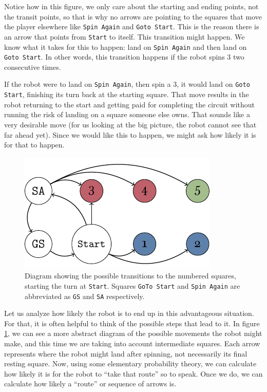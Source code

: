 Notice how in this figure, we only care about the starting and ending points,
not the transit points, so that is why no arrows are pointing to the squares
that move the player elsewhere like \texttt{Spin Again} and \texttt{Goto Start}.
This is the reason there is an arrow that points from \texttt{Start} to itself.
This transition might happen. We know what it takes for this to happen: land on
\texttt{Spin Again} and then land on \texttt{Goto Start}. In other words, this
transition happens if the robot spins 3 two consecutive times.

If the robot were to land on \texttt{Spin Again}, then spin a 3, it would land
on \texttt{Goto Start}, finishing its turn back at the starting square. That
move results in the robot returning to the start and getting paid for completing
the circuit without running the risk of landing on a square someone else owns.
That sounds like a very desirable move (for us looking at the big picture, the
robot cannot see that far ahead yet). Since we would like this to happen, we
might ask how likely it is for that to happen.

\begin{figure}
\centering
\includegraphics[width=\textwidth]{img/transicion.pdf}
\caption{Diagram showing the possible transitions to the 
numbered squares, starting the turn at \texttt{Start}. Squares 
\texttt{GoTo Start} and \texttt{Spin Again} are abbreviated as 
\texttt{GS} and \texttt{SA} respectively.}
\label{fig:markov-start}
\end{figure}

Let us analyze how likely the robot is to end up in this advantageous situation.
For that, it is often helpful to think of the possible steps that lead to it. In
figure \ref{fig:markov-start}, we can see a more abstract diagram of the
possible movements the robot might make, and this time we are taking into
account intermediate squares. Each arrow represents where the robot might land
after spinning, not necessarily its final resting square. Now, using some
elementary probability theory, we can calculate how likely it is for the robot
to ``take that route'' so to speak. Once we do, we can calculate how likely a
``route'' or sequence of arrows is.

